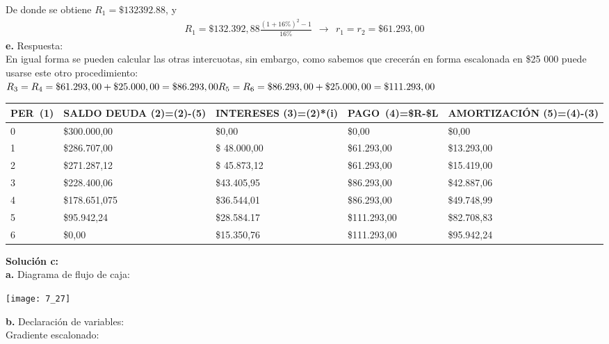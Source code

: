 De donde se obtiene $R_{1}= \$ 132 392.88$, y
\begin{align*}
	R_{1}=\$ 132.392,88 \frac{(1+16\%)^{2}-1}{16\%}\ \ \rightarrow\ \ r_{1}=r_{2}  = \$ 61.293,00
\end{align*}
\textbf{e.}	Respuesta:\\
En igual forma se pueden calcular las otras intercuotas, sin embargo, como sabemos que crecerán en forma escalonada en \$25 000 puede usarse este otro procedimiento:\\

	$R_{3}=R_{4}= \$61.293,00+\$25.000,00 = \$86.293,00\\
	R_{5}=R_{6}= \$86.293,00+\$25.000,00 = \$111.293,00$\\


\begin{spacing}{1.1}
    \begin{center}
        \begin{tabular}{|p{1cm}|p{2cm}|p{2cm}|p{2cm}|p{3cm}|}
        \hline 
        \rowcolor{white!50}
            \textbf{PER\ (1)} & \textbf{SALDO DEUDA (2)=(2)-(5)} & \textbf{INTERESES  (3)=(2)*(i)}& \textbf{PAGO\ (4)=\$R-\$L }& \textbf{AMORTIZACIÓN  (5)=(4)-(3)} \\ \hline                        

            0 & \$300.000,00 & \$0,00 & \$0,00 & \$0,00 \\ \hline 
            1 & \$286.707,00  &\$ 48.000,00  & \$61.293,00  & \$13.293,00 \\ \hline
            2 & \$271.287,12  &\$ 45.873,12  & \$61.293,00  & \$15.419,00 \\ \hline
            3 & \$228.400,06 & \$43.405,95  & \$86.293,00 & \$42.887,06 \\ \hline
            4 & \$178.651,075  & \$36.544,01  & \$86.293,00  & \$49.748,99\\ \hline
            5 & \$95.942,24  & \$28.584.17  & \$111.293,00  & \$82.708,83 \\ \hline
            6 & \$0,00  & \$15.350,76  & \$111.293,00  & \$95.942,24 \\ \hline

 
\end{tabular}
\end{center}
\end{spacing}


\textbf{Solución c:}\\
\textbf{a.}	Diagrama de flujo de caja:
\begin{center}
	\texttt{[image: 7\_27]}
\end{center}
\textbf{b.}	Declaración de variables:\\
Gradiente escalonado:\\
	
